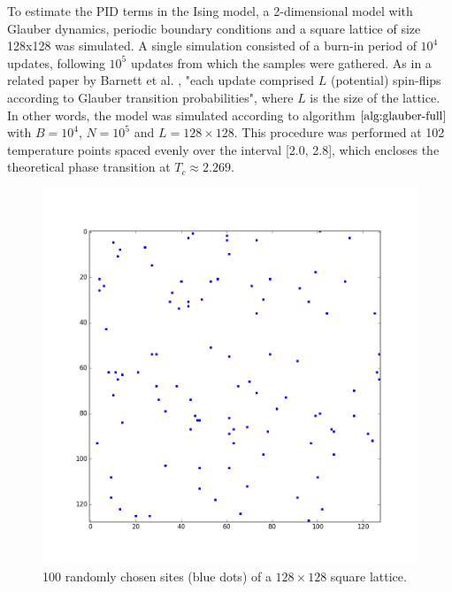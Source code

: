 \documentclass[12pt]{article}
\begin{document}
To estimate the PID terms in the Ising model, a 2-dimensional model with Glauber dynamics, periodic boundary conditions and a square lattice of size 128x128 was simulated. A single simulation consisted of a burn-in period of $10^4$ updates, following $10^5$ updates from which the samples were gathered. As in a related paper by Barnett et al. \cite{barnett-ising}, "each update comprised $L$ (potential) spin-flips according to Glauber transition probabilities", where $L$ is the size of the lattice. In other words, the model was simulated according to algorithm $\ref{alg:glauber-full}$ with $B=10^4$, $N=10^5$ and $L=128\times128$. This procedure was performed at 102 temperature points spaced evenly over the interval [2.0, 2.8], which encloses the theoretical phase transition at $T_c \approx 2.269$. 

\begin{figure} [h]
\begin{center}
\includegraphics[width=.9\textwidth]{ising-grid}
\caption{100 randomly chosen sites (blue dots) of a $128\times128$ square lattice.}
\label{fig:ising-grid}
\end{center}
\end{figure}
\end{document}
